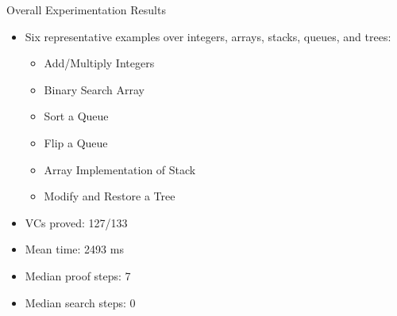 \begin{frame}{Overall Experimentation Results}
	\begin{itemize}
		\item Six representative examples over integers, arrays, stacks, queues, and trees:\\
		\begin{itemize}
			\item Add/Multiply Integers
			\item Binary Search Array
			\item Sort a Queue
			\item Flip a Queue
			\item Array Implementation of Stack
			\item Modify and Restore a Tree
		\end{itemize}
		\item VCs proved: 127/133
		\item Mean time: 2493 ms
		\item Median proof steps: 7
		\item Median search steps: 0
	\end{itemize}
\end{frame}


